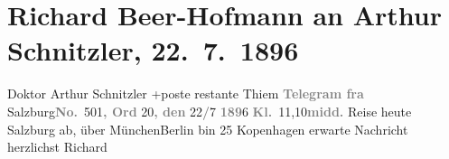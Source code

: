 

         \renewcommand{\erwaehnteOrte}{Orte: Berlin, Kopenhagen, München, Salzburg, Trondheim}
         \renewcommand{\erwaehnteWerke}{}
               \section[Richard Beer-Hofmann an Arthur Schnitzler, 22. 7. 1896]{ Richard Beer-Hofmann an Arthur Schnitzler, 22. 7. 1896}\nopagebreak{}\rehead{ }\begin{ledgroupsized}[t]{13cm}\normalsize\beginnumbering \toendnotes[C]{\smallbreak\pagebreak[2]} 
\pstart{}{\pb}Doktor Arthur Schnitzler
                  +\pend{}\pstart{}poste restante Thiem\pend{}{\bigskip}\pstart
           \noindent{}{\pb}\textcolor{gray}{\textbf{Telegram fra}}{ }Salzburg\textcolor{gray}{\textbf{No.}} 501\textcolor{gray}{\textbf{, Ord}} 20\textcolor{gray}{\textbf{, den}}{ }22\textcolor{gray}{\textbf{/}}7{ }\textcolor{gray}{\textbf{189}}6{ }\textcolor{gray}{\textbf{Kl.}} 11,10\textcolor{gray}{\textbf{midd.}}\pend
           \pstart
           Reise heute Salzburg ab, über MünchenBerlin bin 25{ }Kopenhagen erwarte Nachricht herzlichst\pend
           \pstart \spacefill\mbox{Richard}\pend{}
         
         \endnumbering{}\end{ledgroupsized}  \newcommand{\dateiname}{L00566}\newcommand{\titel}{Richard Beer-Hofmann an Arthur Schnitzler, 22. 7. 1896}\newcommand{\editorInnen}{Martin Anton Müller und Gerd-Hermann Susen}
      